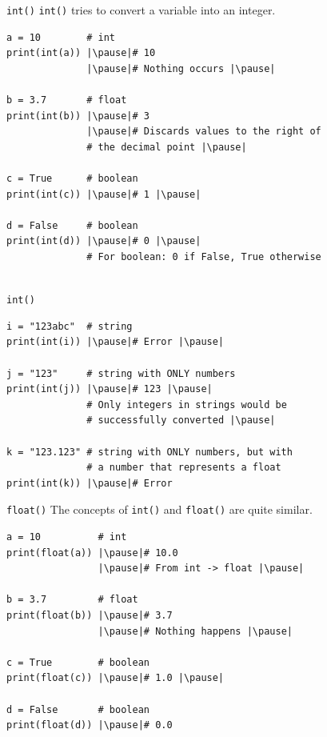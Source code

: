\documentclass[dvipsnames, svgnames, x11names]{beamer}
\begin{document}
\begin{frame}[fragile]{\texttt{int()}}
\texttt{int()} tries to convert a variable into an integer.
\begin{verbatim} 
a = 10        # int
print(int(a)) |\pause|# 10
			  |\pause|# Nothing occurs |\pause|
			  
b = 3.7       # float
print(int(b)) |\pause|# 3
              |\pause|# Discards values to the right of 
              # the decimal point |\pause|
              
c = True      # boolean
print(int(c)) |\pause|# 1 |\pause|

d = False     # boolean
print(int(d)) |\pause|# 0 |\pause|
              # For boolean: 0 if False, True otherwise
              
\end{verbatim}
\end{frame}

\begin{frame}[fragile]{\texttt{int()}}
\begin{verbatim}
i = "123abc"  # string
print(int(i)) |\pause|# Error |\pause|

j = "123"     # string with ONLY numbers
print(int(j)) |\pause|# 123 |\pause|
              # Only integers in strings would be 
              # successfully converted |\pause|

k = "123.123" # string with ONLY numbers, but with 
              # a number that represents a float
print(int(k)) |\pause|# Error 
\end{verbatim}
\end{frame}

\begin{frame}[fragile]{\texttt{float()}}
The concepts of \texttt{int()} and \texttt{float()} are quite similar. \pause
\begin{verbatim} 
a = 10          # int
print(float(a)) |\pause|# 10.0
                |\pause|# From int -> float |\pause|

b = 3.7         # float
print(float(b)) |\pause|# 3.7
                |\pause|# Nothing happens |\pause|

c = True        # boolean
print(float(c)) |\pause|# 1.0 |\pause|

d = False       # boolean
print(float(d)) |\pause|# 0.0
\end{verbatim}
\end{frame}
\end{document}
